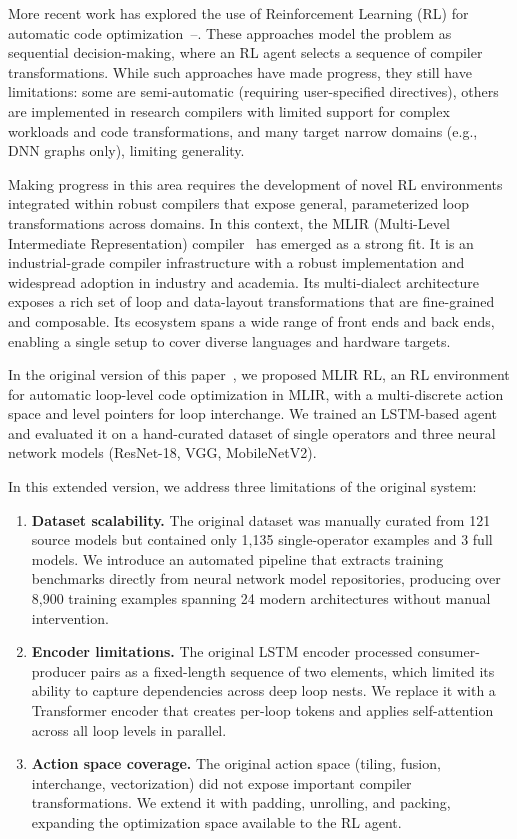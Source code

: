 \documentclass[10pt,twocolumn]{article}
\begin{document}
More recent work has explored the use of Reinforcement Learning (RL) for automatic code optimization~\cite{ref6}--\cite{ref11}. These approaches model the problem as sequential decision-making, where an RL agent selects a sequence of compiler transformations. While such approaches have made progress, they still have limitations: some are semi-automatic (requiring user-specified directives), others are implemented in research compilers with limited support for complex workloads and code transformations, and many target narrow domains (e.g., DNN graphs only), limiting generality.

Making progress in this area requires the development of novel RL environments integrated within robust compilers that expose general, parameterized loop transformations across domains. In this context, the MLIR (Multi-Level Intermediate Representation) compiler~\cite{ref12} has emerged as a strong fit. It is an industrial-grade compiler infrastructure with a robust implementation and widespread adoption in industry and academia. Its multi-dialect architecture exposes a rich set of loop and data-layout transformations that are fine-grained and composable. Its ecosystem spans a wide range of front ends and back ends, enabling a single setup to cover diverse languages and hardware targets.

In the original version of this paper~\cite{ref41}, we proposed MLIR RL, an RL environment for automatic loop-level code optimization in MLIR, with a multi-discrete action space and level pointers for loop interchange. We trained an LSTM-based agent and evaluated it on a hand-curated dataset of single operators and three neural network models (ResNet-18, VGG, MobileNetV2).

In this extended version, we address three limitations of the original system:

\begin{enumerate}
\item \textbf{Dataset scalability.} The original dataset was manually curated from 121 source models but contained only 1,135 single-operator examples and 3 full models. We introduce an automated pipeline that extracts training benchmarks directly from neural network model repositories, producing over 8,900 training examples spanning 24 modern architectures without manual intervention.

\item \textbf{Encoder limitations.} The original LSTM encoder processed consumer-producer pairs as a fixed-length sequence of two elements, which limited its ability to capture dependencies across deep loop nests. We replace it with a Transformer encoder that creates per-loop tokens and applies self-attention across all loop levels in parallel.

\item \textbf{Action space coverage.} The original action space (tiling, fusion, interchange, vectorization) did not expose important compiler transformations. We extend it with padding, unrolling, and packing, expanding the optimization space available to the RL agent.
\end{enumerate}
\end{document}
